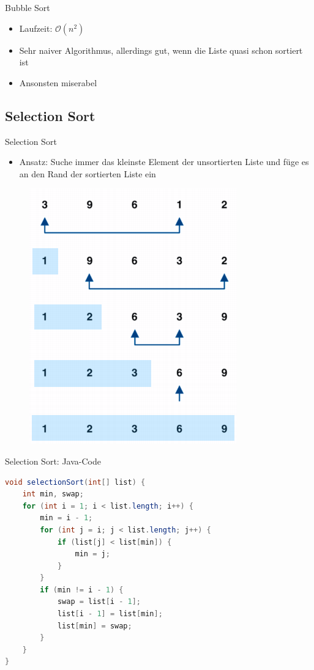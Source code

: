 \documentclass[18pt]{beamer}
\begin{document}
\begin{frame}{Bubble Sort}
    \begin{itemize}
        \item Laufzeit: $\mathcal{O}(n^2)$
        \item Sehr naiver Algorithmus, allerdings gut, wenn die Liste quasi schon sortiert ist
        \item Ansonsten miserabel
    \end{itemize}
\end{frame}

\subsection{Selection Sort}

\begin{frame}{Selection Sort}
    \begin{itemize}
        \item Ansatz: Suche immer das kleinste Element der unsortierten Liste und füge es an den Rand der sortierten Liste ein
    \end{itemize}
    \vspace{.1in}
    \begin{figure}
        \includegraphics[scale=2.6]{img/SelectionSort.png}
    \end{figure}
\end{frame}

\begin{frame}[fragile]{Selection Sort: Java-Code}
    \begin{exampleblock}{}
        \begin{lstlisting}[language=Java,basicstyle=\scriptsize]
void selectionSort(int[] list) {
    int min, swap;
    for (int i = 1; i < list.length; i++) {
        min = i - 1;
        for (int j = i; j < list.length; j++) {
            if (list[j] < list[min]) {
                min = j;
            }
        }
        if (min != i - 1) {
            swap = list[i - 1];
            list[i - 1] = list[min];
            list[min] = swap;
        }
    }
}
        \end{lstlisting}
    \end{exampleblock}
\end{frame}
\end{document}
